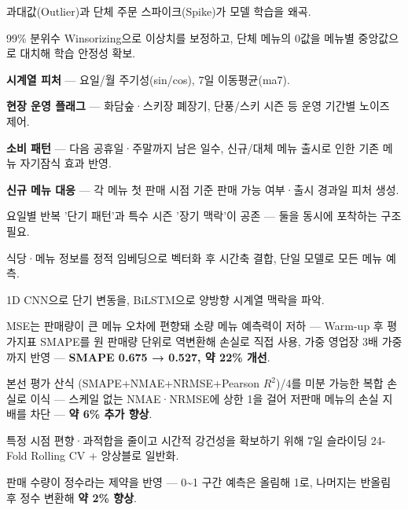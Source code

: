 \begin{substeps}
  \item 과대값(Outlier)과 단체 주문 스파이크(Spike)가 모델 학습을 왜곡.
  \item 99\% 분위수 Winsorizing으로 이상치를 보정하고, 단체 메뉴의 0값을 메뉴별 중앙값으로 대치해 학습 안정성 확보.
\end{substeps}

\begin{substeps}
  \item \textbf{시계열 피처} --- 요일/월 주기성(sin/cos), 7일 이동평균(ma7).
  \item \textbf{현장 운영 플래그} --- 화담숲·스키장 폐장기, 단풍/스키 시즌 등 운영 기간별 노이즈 제어.
  \item \textbf{소비 패턴} --- 다음 공휴일·주말까지 남은 일수, 신규/대체 메뉴 출시로 인한 기존 메뉴 자기잠식 효과 반영.
  \item \textbf{신규 메뉴 대응} --- 각 메뉴 첫 판매 시점 기준 판매 가능 여부·출시 경과일 피처 생성.
\end{substeps}

\begin{substeps}
  \item 요일별 반복 '단기 패턴'과 특수 시즌 '장기 맥락'이 공존 --- 둘을 동시에 포착하는 구조 필요.
  \item 식당·메뉴 정보를 정적 임베딩으로 벡터화 후 시간축 결합, 단일 모델로 모든 메뉴 예측.
  \item 1D CNN으로 단기 변동을, BiLSTM으로 양방향 시계열 맥락을 파악.
\end{substeps}

\begin{substeps}
  \item MSE는 판매량이 큰 메뉴 오차에 편향돼 소량 메뉴 예측력이 저하 --- Warm-up 후 평가지표 SMAPE를 원 판매량 단위로 역변환해 손실로 직접 사용, 가중 영업장 3배 가중까지 반영 --- \textbf{SMAPE 0.675 → 0.527, 약 22\% 개선}.
  \item 본선 평가 산식 (SMAPE+NMAE+NRMSE+Pearson $R^2$)/4를 미분 가능한 복합 손실로 이식 --- 스케일 없는 NMAE·NRMSE에 상한 1을 걸어 저판매 메뉴의 손실 지배를 차단 --- \textbf{약 6\% 추가 향상}.
\end{substeps}

\begin{substeps}
  \item 특정 시점 편향·과적합을 줄이고 시간적 강건성을 확보하기 위해 7일 슬라이딩 24-Fold Rolling CV + 앙상블로 일반화.
  \item 판매 수량이 정수라는 제약을 반영 --- 0\textasciitilde1 구간 예측은 올림해 1로, 나머지는 반올림 후 정수 변환해 \textbf{약 2\% 향상}.
\end{substeps}

\vspace{-1.2mm}%

\setlength{\stepgap}{0.9mm}
\setlength{\substepsep}{0.22mm}
